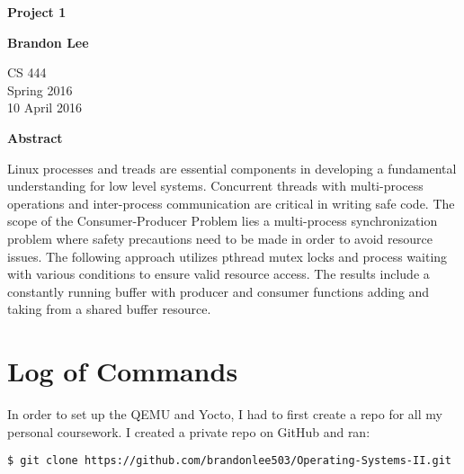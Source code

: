 \documentclass[letterpaper,10pt,titlepage]{article}
\begin{document}
\begin{titlepage}
    \begin{center}
        \vspace*{3.5cm}

        \textbf{Project 1}

        \vspace{0.5cm}

        \textbf{Brandon Lee}

        \vspace{0.8cm}

        CS 444\\
        Spring 2016\\
        10 April 2016\\

        \vspace{1cm}

        \textbf{Abstract}\\

        \vspace{0.5cm}

        Linux processes and treads are essential components in developing a fundamental understanding for low level systems.  Concurrent threads with multi-process operations and inter-process communication are critical in writing safe code.  The scope of the Consumer-Producer Problem lies a multi-process synchronization problem where safety precautions need to be made in order to avoid resource issues.  The following approach utilizes pthread mutex locks and process waiting with various conditions to ensure valid resource access.  The results include a constantly running buffer with producer and consumer functions adding and taking from a shared buffer resource.

        \vfill



    \end{center}
\end{titlepage}

\newpage

\section{Log of Commands}

In order to set up the QEMU and Yocto, I had to first create a repo for all my personal coursework.  I created a private repo on GitHub and ran:

\begin{lstlisting}
$ git clone https://github.com/brandonlee503/Operating-Systems-II.git
\end{lstlisting}
\end{document}
